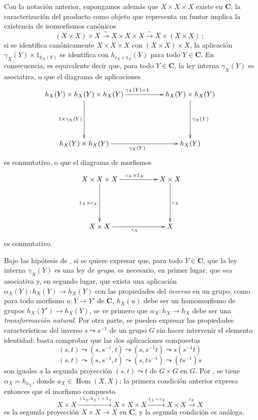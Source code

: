 \begin{env}[8.2.5]
\label{0.8.2.5}
\label{0.8.2.5-fr}
Con la notación anterior, supongamos además que $X\times X\times X$ existe en $\boldsymbol{C}$; la caracterización del producto como objeto que representa un funtor  implica la existencia de isomorfismos canónicos
\[
  (X\times X)\times X\xrightarrow{\sim}X\times X\times X
  \xrightarrow{\sim}X\times(X\times X)~;
\]
si se identifica canónicamente $X\times X\times X$ con $(X\times X)\times X$, la aplicación $\gamma_X(Y)\times 1_{h_X(Y)}$ se identifica con $h_{c_X\times 1_X}(Y)$ para todo $Y\in \boldsymbol{C}$.
En consecuencia, es equivalente decir que, para todo $Y\in \boldsymbol{C}$, la ley interna $\gamma_X(Y)$ es asociativa, o que el diagrama de aplicaciones
\[
  \xymatrix{
    h_X(Y)\times h_X(Y)\times h_X(Y)
      \ar[rr]^{\gamma_X(Y)\times 1}\ar[dd]_{1\times\gamma_X(Y)} &&
    h_X(Y)\times h_X(Y)\ar[dd]^{\gamma_X(Y)}\\\\
    h_X(Y)\times h_X(Y)\ar[rr]_{\gamma_X(Y)} && h_X(Y)
  }
\]
es conmutativo, o que el diagrama de morfismos
\[
  \xymatrix{
    X\times X\times X
      \ar[rr]^{c_X\times 1_X}\ar[dd]_{1_X\times c_X} &&
    X\times X\ar[dd]^{c_X}\\\\
    X\times X\ar[rr]_{c_X} && X
  }
\]
es conmutativo.
\end{env}

\begin{env}[8.2.6]
\label{0.8.2.6}
\label{0.8.2.6-fr}
Bajo las hipótesis de , si se quiere expresar que, para todo $Y\in \boldsymbol{C}$, que la ley interna $\gamma_X(Y)$ es una ley de \emph{grupo}, es necesario, en primer lugar, que sea asociativa y, en segundo lugar, que exista una aplicación $\alpha_X(Y):h_X(Y)\to h_X(Y)$ con las propiedades del \emph{inverso} en un grupo; como para todo morfismo $u:Y\to Y'$ de $\boldsymbol{C}$, $h_X(u)$ debe ser un homomorfismo de grupos $h_X(Y')\to h_X(Y)$, se ve primero que $\alpha_X:h_X\to h_X$ debe ser una \emph{transformación natural}.
Por otra parte, se pueden expresar las propiedades características del inverso $s\leadsto s^{-1}$ de un grupo $G$ sin hacer intervenir el elemento identidad: basta comprobar que las dos aplicaciones compuestas
\[
  (s,t)\leadsto(s,s^{-1},t)\leadsto(s,s^{-1}t)\leadsto s(s^{-1}t)
\]
\[
  (s,t)\leadsto(s,s^{-1},t)\leadsto(s,ts^{-1})\leadsto(ts^{-1})s
\]
son iguales a la segunda proyección $(s,t)\leadsto t$ de $G\times G$ en $G$.
Por , se tiene $\alpha_X=h_{a_X}$, donde $a_X\in\operatorname{Hom}(X,X)$; la primera condición anterior expresa entonces que el morfismo compuesto
\[
  X\times X\xrightarrow{(1_X,a_X)\times 1_X}X\times X\times X
  \xrightarrow{1_X\times c_X}X\times X\xrightarrow{c_X}X
\]
es la segunda proyección $X\times X\to X$ en $\boldsymbol{C}$, y la segunda condición es análoga.
\end{env}

